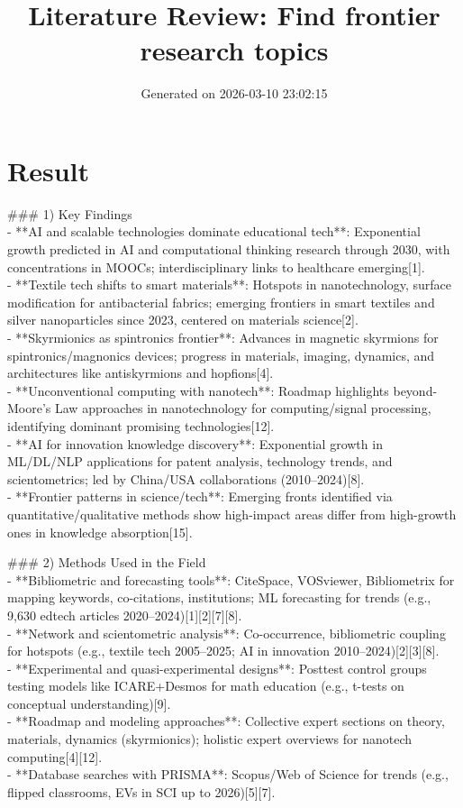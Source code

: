 \documentclass[11pt]{article}
\title{Literature Review: Find frontier research topics}
\date{Generated on 2026-03-10 23:02:15}
\begin{document}
\maketitle
\section*{Result}
\#\#\# 1) Key Findings\\ - **AI and scalable technologies dominate educational tech**: Exponential growth predicted in AI and computational thinking research through 2030, with concentrations in MOOCs; interdisciplinary links to healthcare emerging[1].\\ - **Textile tech shifts to smart materials**: Hotspots in nanotechnology, surface modification for antibacterial fabrics; emerging frontiers in smart textiles and silver nanoparticles since 2023, centered on materials science[2].\\ - **Skyrmionics as spintronics frontier**: Advances in magnetic skyrmions for spintronics/magnonics devices; progress in materials, imaging, dynamics, and architectures like antiskyrmions and hopfions[4].\\ - **Unconventional computing with nanotech**: Roadmap highlights beyond-Moore's Law approaches in nanotechnology for computing/signal processing, identifying dominant promising technologies[12].\\ - **AI for innovation knowledge discovery**: Exponential growth in ML/DL/NLP applications for patent analysis, technology trends, and scientometrics; led by China/USA collaborations (2010–2024)[8].\\ - **Frontier patterns in science/tech**: Emerging fronts identified via quantitative/qualitative methods show high-impact areas differ from high-growth ones in knowledge absorption[15].

\#\#\# 2) Methods Used in the Field\\ - **Bibliometric and forecasting tools**: CiteSpace, VOSviewer, Bibliometrix for mapping keywords, co-citations, institutions; ML forecasting for trends (e.g., 9,630 edtech articles 2020–2024)[1][2][7][8].\\ - **Network and scientometric analysis**: Co-occurrence, bibliometric coupling for hotspots (e.g., textile tech 2005–2025; AI in innovation 2010–2024)[2][3][8].\\ - **Experimental and quasi-experimental designs**: Posttest control groups testing models like ICARE+Desmos for math education (e.g., t-tests on conceptual understanding)[9].\\ - **Roadmap and modeling approaches**: Collective expert sections on theory, materials, dynamics (skyrmionics); holistic expert overviews for nanotech computing[4][12].\\ - **Database searches with PRISMA**: Scopus/Web of Science for trends (e.g., flipped classrooms, EVs in SCI up to 2026)[5][7].
\end{document}
